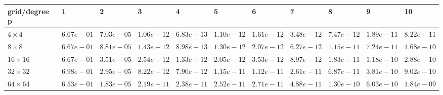 \begin{tabular}{lllllllllll}
\hline
 grid/degree p   & 1          & 2          & 3          & 4          & 5          & 6          & 7          & 8          & 9          & 10         \\
\hline
 $4 \times 4$    & $6.67e-01$ & $7.03e-05$ & $1.06e-12$ & $6.83e-13$ & $1.10e-12$ & $1.61e-12$ & $3.48e-12$ & $7.47e-12$ & $1.89e-11$ & $8.22e-11$ \\
 $8 \times 8$    & $6.67e-01$ & $8.81e-05$ & $1.43e-12$ & $8.98e-13$ & $1.30e-12$ & $2.07e-12$ & $6.27e-12$ & $1.15e-11$ & $7.24e-11$ & $1.68e-10$ \\
 $16 \times 16$  & $6.67e-01$ & $3.51e-05$ & $2.54e-12$ & $1.33e-12$ & $2.05e-12$ & $3.53e-12$ & $8.97e-12$ & $1.83e-11$ & $1.18e-10$ & $2.88e-10$ \\
 $32 \times 32$  & $6.98e-01$ & $2.95e-05$ & $8.22e-12$ & $7.90e-12$ & $1.15e-11$ & $1.12e-11$ & $2.61e-11$ & $6.87e-11$ & $3.81e-10$ & $9.02e-10$ \\
 $64 \times 64$  & $6.53e-01$ & $1.83e-05$ & $2.19e-11$ & $2.38e-11$ & $2.52e-11$ & $2.71e-11$ & $4.88e-11$ & $1.30e-10$ & $6.03e-10$ & $1.84e-09$ \\
\hline
\end{tabular}